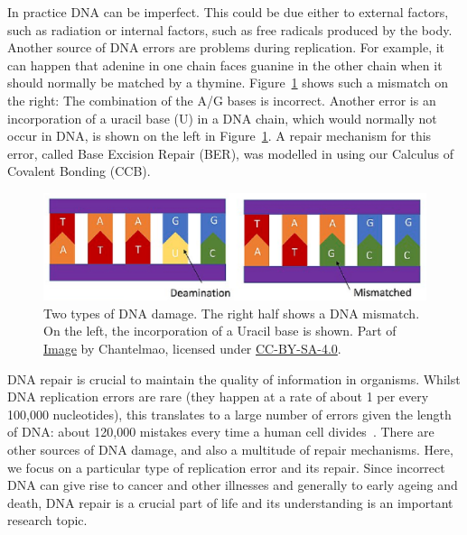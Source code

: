\documentclass[review]{elsarticle}
\begin{document}
In practice DNA can be imperfect. This could be due either to external factors, such as radiation 
or internal factors, such as free radicals produced by the body. Another source of DNA errors are problems during replication. For example, it can happen that adenine in one chain faces guanine in the other chain when it should normally be matched by a thymine. Figure~\ref{fig:damages} shows such a mismatch on the right: The combination of the A/G bases is incorrect. Another error is an incorporation of a uracil base (U) in a DNA chain, which would normally not occur in DNA, is shown on the left in Figure~\ref{fig:damages}. A repair mechanism for this error, called Base Excision Repair (BER), was modelled in \cite{10.1007/978-3-319-99498-7_8} using our Calculus of Covalent Bonding (CCB).

\begin{figure}[h!]
  \centering
    \includegraphics[width=1.0\textwidth]{Types_of_DNA_Damage_part}
  \caption[Two types of DNA damage.]{Two types of DNA damage. The right half shows a DNA mismatch.
  On the left, the incorporation of a Uracil base is shown.
  Part of \href{https://commons.wikimedia.org/wiki/File:Types_of_DNA_Damage.jpg}{Image} by Chantelmao, licensed under \href{https://creativecommons.org/licenses/by-sa/4.0/deed.en}{CC-BY-SA-4.0}.}
  \label{fig:damages}
\end{figure}

DNA repair is crucial to maintain the quality of information in organisms. Whilst DNA replication errors are rare (they happen at a rate of about 1 per every 100,000 nucleotides), this translates to a large number of errors given the length of DNA: about 120,000 mistakes every time a human cell divides~\cite{damage}. There are other sources of DNA damage, and also a multitude of repair mechanisms. Here, we focus on a particular type of replication error and its repair. Since incorrect DNA can give rise to cancer and other illnesses and generally to early ageing and death, DNA repair is a crucial part of life and its understanding is an important research topic.
\end{document}
